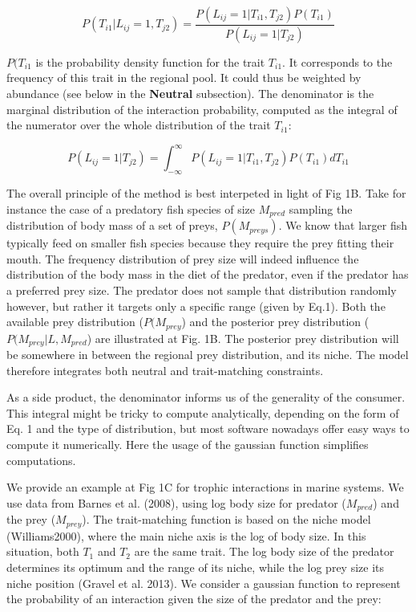 \documentclass[11pt]{article}
\begin{document}
\begin{equation}  
	P(T_{i1}|L_{ij}=1,T_{j2})=\frac{P(L_{ij}=1|T_{i1},T_{j2})P(T_{i1})}{P(L_{ij}=1|T_{j2})}
\end{equation}

$P(T_{i1}$ is the probability density function for the trait $T_{i1}$. It corresponds to the frequency of this trait in the regional pool. It could thus be weighted by abundance (see below in the \textbf{Neutral} subsection). The denominator is the marginal distribution of the interaction probability, computed as the integral of the numerator over the whole distribution of the trait $T_{i1}$:

\begin{equation}  
	P(L_{ij}=1|T_{j2})=\int_{-\infty}^{\infty}P(L_{ij}=1|T_{i1},T_{j2})P(T_{i1})dT_{i1}
\end{equation}

The overall principle of the method is best interpeted in light of Fig 1B. Take for instance the case of a predatory fish species of size $M_{pred}$ sampling the distribution of body mass of a set of preys, $P(M_{preys})$. We know that larger fish typically feed on smaller fish species because they require the prey fitting their mouth. The frequency distribution of prey size will indeed influence the distribution of the body mass in the diet of the predator, even if the predator has a preferred prey size. The predator does not sample that distribution randomly however, but rather it targets only a specific range (given by Eq.1). Both the available prey distribution ($P(M_{prey}$) and the posterior prey distribution ($P(M_{prey} |L,M_{pred}$) are illustrated at Fig. 1B. The posterior prey distribution will be somewhere in between the regional prey distribution, and its niche. The model therefore integrates both neutral and trait-matching constraints. 

As a side product, the denominator informs us of the generality of the consumer. This integral might be tricky to compute analytically, depending on the form of Eq. 1 and the type of distribution, but most software nowadays offer easy ways to compute it numerically. Here the usage of the gaussian function simplifies computations. 

We provide an example at Fig 1C for trophic interactions in marine systems. We use data from Barnes et al. (2008), using log body size for predator ($M_{pred}$) and the prey ($M_{prey}$). The trait-matching function is based on the niche model (Williams2000), where the main niche axis is the log of body size. In this situation, both $T_1$ and $T_2$ are the same trait. The log body size of the predator determines its optimum and the range of its niche, while the log prey size its niche position (Gravel et al. 2013). We consider a gaussian function to represent the probability of an interaction given the size of the predator and the prey:
\end{document}
